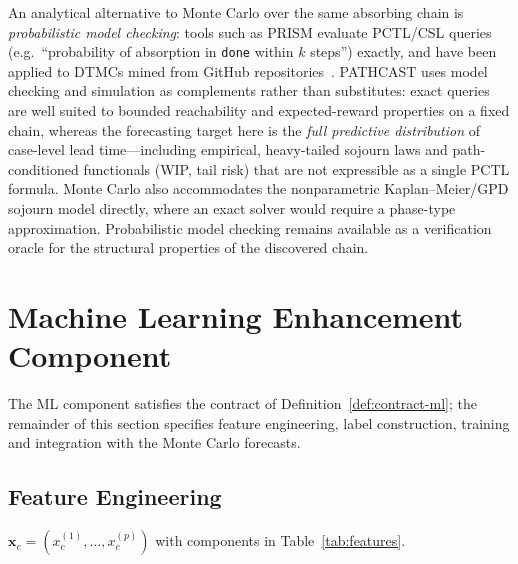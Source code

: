 \begin{remark}
\label{rem:vs-model-checking}
An analytical alternative to Monte Carlo over the same absorbing chain is
\emph{probabilistic model checking}: tools such as PRISM evaluate
PCTL/CSL queries (e.g.\ ``probability of absorption in \texttt{done} within
$k$ steps'') exactly, and have been applied to DTMCs mined from GitHub
repositories~\cite{jo2024}. PATHCAST uses model checking and simulation as
complements rather than substitutes: exact queries are well suited to bounded
reachability and expected-reward properties on a fixed chain, whereas the
forecasting target here is the \emph{full predictive distribution} of
case-level lead time---including empirical, heavy-tailed sojourn laws and
path-conditioned functionals (WIP, tail risk) that are not expressible as a
single PCTL formula. Monte Carlo also accommodates the nonparametric
Kaplan--Meier/GPD sojourn model directly, where an exact solver would require
a phase-type approximation. Probabilistic model checking remains available as
a verification oracle for the structural properties of the discovered chain.
\end{remark}


\section{Machine Learning Enhancement Component}
\label{sec:ml-component}

The ML component satisfies the contract of
Definition~\ref{def:contract-ml}; the remainder of this section specifies
feature engineering, label construction, training and integration with the
Monte Carlo forecasts.


\subsection{Feature Engineering}
\label{sec:ml-feature-eng}

\begin{definition}
\label{def:feature-vector}
$\mathbf{x}_c = (x_c^{(1)}, \ldots, x_c^{(p)})$ with components in
Table~\ref{tab:features}.
\end{definition}

